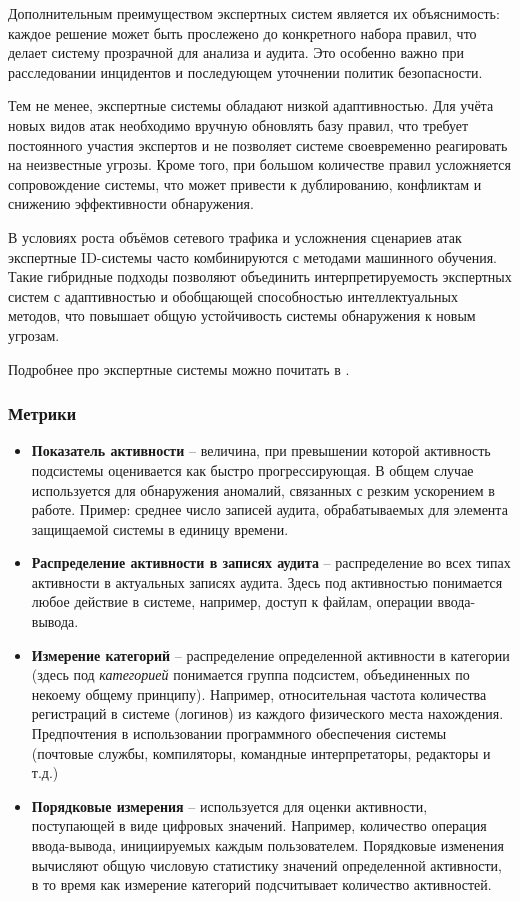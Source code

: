 Дополнительным преимуществом экспертных систем является их объяснимость: каждое решение может быть прослежено до конкретного набора правил, что делает систему прозрачной для анализа и аудита. Это особенно важно при расследовании инцидентов и последующем уточнении политик безопасности.

Тем не менее, экспертные системы обладают низкой адаптивностью. Для учёта новых видов атак необходимо вручную обновлять базу правил, что требует постоянного участия экспертов и не позволяет системе своевременно реагировать на неизвестные угрозы. Кроме того, при большом количестве правил усложняется сопровождение системы, что может привести к дублированию, конфликтам и снижению эффективности обнаружения.

В условиях роста объёмов сетевого трафика и усложнения сценариев атак экспертные ID-системы часто комбинируются с методами машинного обучения. Такие гибридные подходы позволяют объединить интерпретируемость экспертных систем с адаптивностью и обобщающей способностью интеллектуальных методов, что повышает общую устойчивость системы обнаружения к новым угрозам.

Подробнее про экспертные системы можно почитать в \autocite{BeynonDavies}.


\subsubsection{Метрики}

\begin{itemize}
	\item \textbf{Показатель активности} -- величина, при превышении которой активность
	подсистемы оценивается как быстро прогрессирующая. В общем случае используется для
	обнаружения аномалий, связанных с резким ускорением в работе. Пример: среднее число
	записей аудита, обрабатываемых для элемента защищаемой системы в единицу времени.

	\item \textbf{Распределение активности в записях аудита} -- распределение во всех типах
	активности в актуальных записях аудита. Здесь под активностью понимается любое действие
	в системе, например, доступ к файлам, операции ввода-вывода.

	\item \textbf{Измерение категорий} -- распределение определенной активности в
	категории (здесь под \textit{категорией} понимается группа подсистем, объединенных по
некоему общему принципу). Например, относительная частота количества регистраций в
	системе (логинов) из каждого физического места нахождения. Предпочтения в использовании
	программного обеспечения системы (почтовые службы, компиляторы, командные интерпретаторы,
	редакторы и т.д.)

	\item \textbf{Порядковые измерения} -- используется для оценки активности, поступающей
	в виде цифровых значений. Например, количество операция ввода-вывода, инициируемых каждым
	пользователем. Порядковые изменения вычисляют общую числовую статистику значений определенной
	активности, в то время как измерение категорий подсчитывает количество активностей.
\end{itemize}



